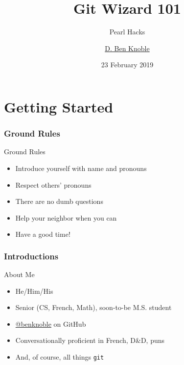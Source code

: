 \documentclass{beamer}
\title{Git Wizard 101}
\subtitle{Pearl Hacks}
\author{\href{https://benknoble.github.io}{D. Ben Knoble}}
\institute{UNC Chapel Hill}
\date{23 February 2019}
\theoremstyle{example}
\begin{document}

\frame{\titlepage}

\part{Getting Started}
\frame{\partpage}
\frame{\tableofcontents[part=1]}

\section{Ground Rules}
\begin{frame}{Ground Rules}
    \begin{itemize}
        \item Introduce yourself with name and pronouns
        \item Respect others' pronouns
        \item There are no dumb questions
        \item Help your neighbor when you can
        \item Have a good time!
    \end{itemize}
\end{frame}

\section{Introductions}
\begin{frame}{About Me}
    \begin{itemize}
        \item He/Him/His
        \item Senior (CS, French, Math), soon-to-be M.S. student
        \item \href{https://github.com/benknoble}{@benknoble} on GitHub
        \item<2-> Conversationally proficient in French, D\&D, puns
        \item<3-> And, of course, all things \texttt{git}
    \end{itemize}
\end{frame}
\end{document}
